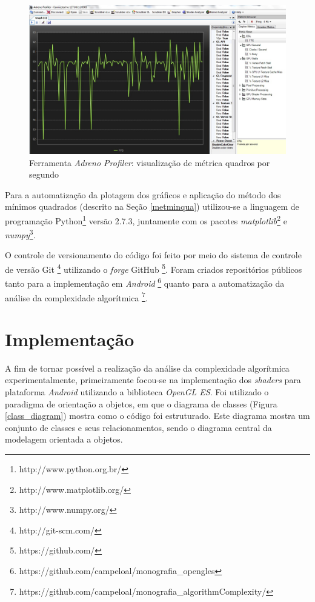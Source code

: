 	\begin{figure}[ht]
	\centering
		\includegraphics[keepaspectratio=true,scale=0.35]{figuras/graph.jpg}
	\caption{Ferramenta \textit{Adreno Profiler}: visualização de métrica quadros por segundo}
	\label{graph}
	\end{figure}

	Para a automatização da plotagem dos gráficos e aplicação do método dos mínimos quadrados (descrito na Seção \ref{metminqua}) utilizou-se a linguagem de programação Python\footnote{http://www.python.org.br/} versão 2.7.3, juntamente com os pacotes  \textit{matplotlib}\footnote{http://www.matplotlib.org/} e  \textit{numpy}\footnote{http://www.numpy.org/}. 

	O controle de versionamento do código foi feito por meio do sistema de controle de versão Git \footnote{http://git-scm.com/} utilizando o \textit{forge} GitHub \footnote{https://github.com/}. Foram criados repositórios públicos tanto para a implementação em \textit{Android} \footnote{https://github.com/campeloal/monografia\_opengles} quanto para a automatização da análise da complexidade algorítmica \footnote{https://github.com/campeloal/monografia\_algorithmComplexity/}. 

\section{Implementação} 
\label{imp}

	 A fim de tornar possível a realização da análise da complexidade algorítmica experimentalmente, primeiramente focou-se na implementação dos \textit{shaders} para plataforma \textit{Android} utilizando a biblioteca \textit{OpenGL ES}. Foi utilizado  o paradigma de orientação a objetos, em que o diagrama de classes (Figura \ref{class_diagram}) mostra como o código foi estruturado. Este diagrama mostra um conjunto de classes e seus relacionamentos, sendo o diagrama central da modelagem orientada a objetos. 


